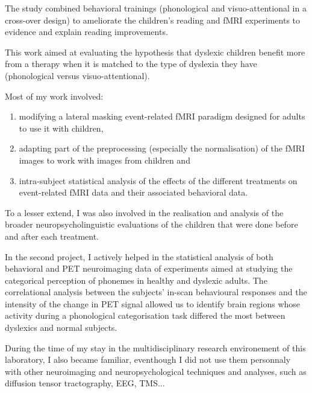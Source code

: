 \documentclass[a4paper,12pt,oneside]{letter}
\begin{document}
{The study combined behavioral trainings (phonological and visuo-attentional in a cross-over design) to ameliorate the children's reading and fMRI experiments to evidence and explain reading improvements. 

This work aimed at evaluating the hypothesis that dyslexic children benefit more from a therapy when it is matched to the type of dyslexia they have (phonological versus visuo-attentional). 

Most of my work involved: 
\begin{enumerate}
\item modifying a lateral masking event-related fMRI paradigm designed for adults to use it with children, 
\item adapting part of the preprocessing (especially the normalisation) of the fMRI images to work with images from children and 
\item intra-subject statistical analysis of the effects of the different treatments on event-related fMRI data and their associated behavioral data.                                                                                                                                                                                                                                                                                                                                                                                                                 \end{enumerate}

To a lesser extend, I was also involved in the realisation and analysis of the broader neuropsycholinguistic evaluations of the children that were done before and after each treatment.

In the second project, I actively helped in the statistical analysis of both behavioral and PET neuroimaging data of experiments aimed at studying the categorical perception of phonemes in healthy and dyslexic adults. The correlational analysis between the subjects' in-scan behavioural responses and the intensity of the change in PET signal allowed us to identify brain regions whose activity during a phonological categorisation task differed the most between dyslexics and normal subjects.

During the time of my stay in the multidisciplinary research environement of this laboratory, I also became familiar, eventhough I did not use them personnaly with other neuroimaging and neuropsychological techniques and analyses, such as diffusion tensor tractography, EEG, TMS...

}
\end{document}
